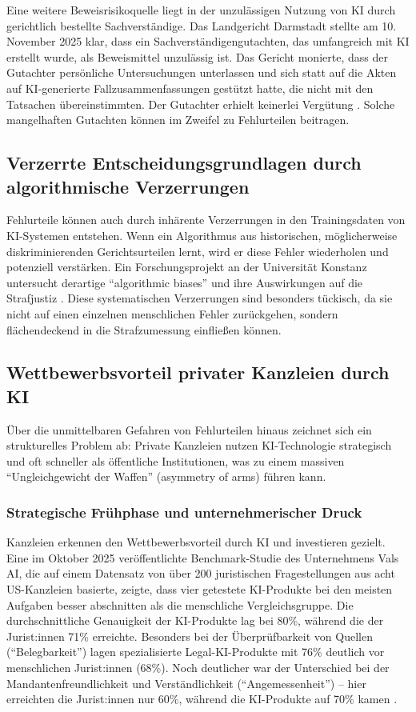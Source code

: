\documentclass[12pt,a4paper]{article}
\begin{document}
	Eine weitere Beweisrisikoquelle liegt in der unzulässigen Nutzung von KI durch gerichtlich bestellte Sachverständige. Das Landgericht Darmstadt stellte am 10. November 2025 klar, dass ein Sachverständigengutachten, das umfangreich mit KI erstellt wurde, als Beweismittel unzulässig ist. Das Gericht monierte, dass der Gutachter persönliche Untersuchungen unterlassen und sich statt auf die Akten auf KI-generierte Fallzusammenfassungen gestützt hatte, die nicht mit den Tatsachen übereinstimmten. Der Gutachter erhielt keinerlei Vergütung \cite{LG Darmstadt2025}. Solche mangelhaften Gutachten können im Zweifel zu Fehlurteilen beitragen.
	
	\subsection{Verzerrte Entscheidungsgrundlagen durch algorithmische Verzerrungen}
	
	Fehlurteile können auch durch inhärente Verzerrungen in den Trainingsdaten von KI-Systemen entstehen. Wenn ein Algorithmus aus historischen, möglicherweise diskriminierenden Gerichtsurteilen lernt, wird er diese Fehler wiederholen und potenziell verstärken. Ein Forschungsprojekt an der Universität Konstanz untersucht derartige \enquote{algorithmic biases} und ihre Auswirkungen auf die Strafjustiz \cite{Uni Konstanz2025}. Diese systematischen Verzerrungen sind besonders tückisch, da sie nicht auf einen einzelnen menschlichen Fehler zurückgehen, sondern flächendeckend in die Strafzumessung einfließen können.
	
	\subsection{Wettbewerbsvorteil privater Kanzleien durch KI}
	
	Über die unmittelbaren Gefahren von Fehlurteilen hinaus zeichnet sich ein strukturelles Problem ab: Private Kanzleien nutzen KI-Technologie strategisch und oft schneller als öffentliche Institutionen, was zu einem massiven \enquote{Ungleichgewicht der Waffen} (asymmetry of arms) führen kann.
	
	\subsubsection{Strategische Frühphase und unternehmerischer Druck}
	Kanzleien erkennen den Wettbewerbsvorteil durch KI und investieren gezielt. Eine im Oktober 2025 veröffentlichte Benchmark-Studie des Unternehmens Vals AI, die auf einem Datensatz von über 200 juristischen Fragestellungen aus acht US-Kanzleien basierte, zeigte, dass vier getestete KI-Produkte bei den meisten Aufgaben besser abschnitten als die menschliche Vergleichsgruppe. Die durchschnittliche Genauigkeit der KI-Produkte lag bei 80\%, während die der Jurist:innen 71\% erreichte. Besonders bei der Überprüfbarkeit von Quellen (\enquote{Belegbarkeit}) lagen spezialisierte Legal-KI-Produkte mit 76\% deutlich vor menschlichen Jurist:innen (68\%). Noch deutlicher war der Unterschied bei der Mandantenfreundlichkeit und Verständlichkeit (\enquote{Angemessenheit}) – hier erreichten die Jurist:innen nur 60\%, während die KI-Produkte auf 70\% kamen \cite{ValAI2025}.
	
\end{document}

